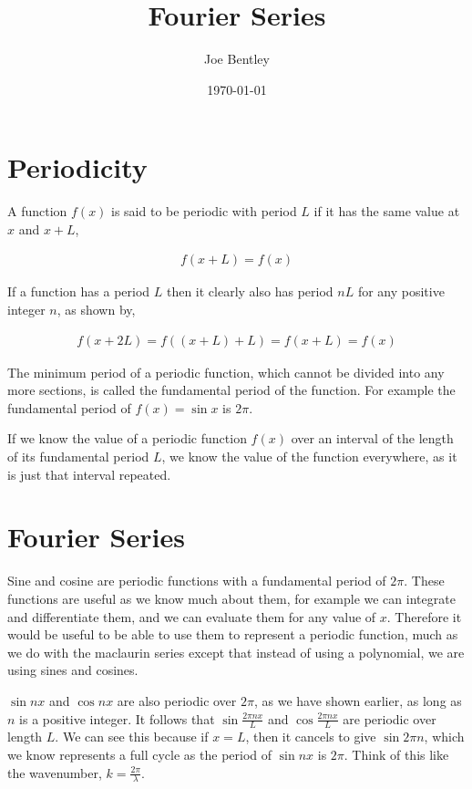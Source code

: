 \documentclass[11pt]{amsart}
\title{Fourier Series}
\author{Joe Bentley}
\date{\today}
\begin{document}
\maketitle

\newpage

\section{Periodicity}

A function $f(x)$ is said to be periodic with period $L$ if it has the same value at $x$ and $x + L$,

\begin{align*}
  f(x + L) = f(x)
\end{align*}

If a function has a period $L$ then it clearly also has period $nL$ for any positive integer $n$, as shown by,

\begin{align*}
  f(x + 2L) = f\left((x+L)+L\right) = f(x+L) = f(x)
\end{align*}

The minimum period of a periodic function, which cannot be divided into any more sections, is called the fundamental period of the function. For example the fundamental period of $f(x) = \sin{x}$ is $2\pi$.

If we know the value of a periodic function $f(x)$ over an interval of the length of its fundamental period $L$, we know the value of the function everywhere, as it is just that interval repeated.

\section{Fourier Series}

Sine and cosine are periodic functions with a fundamental period of $2\pi$. These functions are useful as we know much about them, for example we can integrate and differentiate them, and we can evaluate them for any value of $x$. Therefore it would be useful to be able to use them to represent a periodic function, much as we do with the maclaurin series except that instead of using a polynomial, we are using sines and cosines.

$\sin nx$ and $\cos nx$ are also periodic over $2\pi$, as we have shown earlier, as long as $n$ is a positive integer. It follows that $\sin{\frac{2\pi nx}{L}}$ and $\cos{\frac{2\pi nx}{L}}$ are periodic over length $L$. We can see this because if $x = L$, then it cancels to give $\sin{2\pi n}$, which we know represents a full cycle as the period of $\sin{nx}$ is $2\pi$. Think of this like the wavenumber, $k = \frac{2\pi}{\lambda}$.
\end{document}
